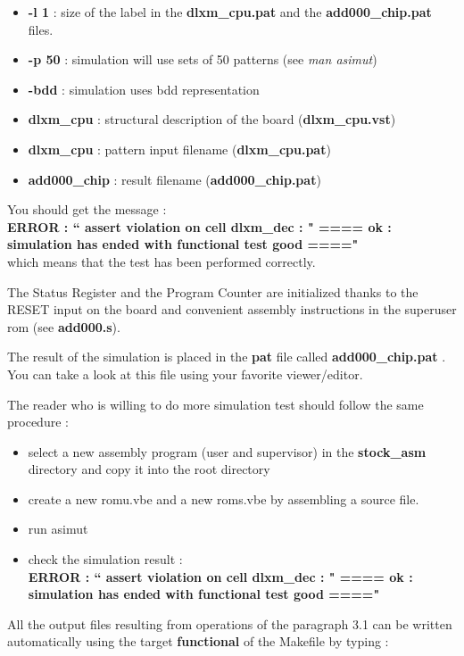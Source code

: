 \begin{itemize} 
\item
{\bf -l 1} : size of the label in the {\bf dlxm\_cpu.pat} and the {\bf
add000\_chip.pat} files.
\item 
{\bf -p 50} : simulation will use sets of 50 patterns (see {\it man
asimut})
\item
{\bf -bdd} : simulation uses bdd representation
\item
{\bf dlxm\_cpu} : structural description of the board  ({\bf dlxm\_cpu.vst}) 
\item
{\bf dlxm\_cpu} : pattern input filename ({\bf dlxm\_cpu.pat}) 
\item
{\bf add000\_chip} : result filename ({\bf add000\_chip.pat}) 
\end{itemize}

You should get the message : \\
{\bf ERROR : `` assert violation on cell dlxm\_dec : " ==== ok :
simulation has ended with functional test good ===="}\\
which means that the test has been performed correctly.

The Status Register and the Program Counter are initialized thanks to
the RESET input on the board and convenient assembly instructions in
the superuser rom (see {\bf add000.s}).

The result of the simulation is placed in the {\bf pat} file called
{\bf add000\_chip.pat} . You can take a look at this file using your favorite viewer/editor. 

The reader who is willing to do more simulation test should follow the same procedure :

\begin{itemize}
\item
select a new assembly program (user and supervisor) in the {\bf stock\_asm} directory and copy it into the root directory    
\item
create a new romu.vbe and a new roms.vbe by assembling a source file.

\item
run asimut
\item
check the simulation result : \\
{\bf ERROR : `` assert violation on cell dlxm\_dec : " ==== ok :
simulation has ended with functional test good ===="\\}
\end{itemize}


All the output files resulting from operations of the paragraph 3.1 can be written automatically using the target {\bf functional} of the Makefile by typing :

